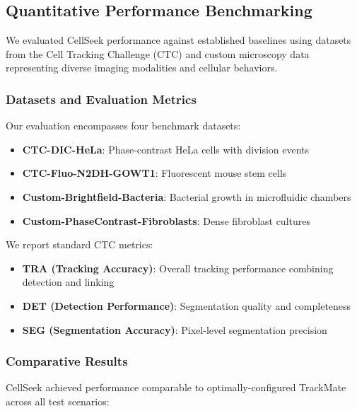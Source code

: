 \documentclass[12pt]{article}
\begin{document}
\subsection{Quantitative Performance Benchmarking}


We evaluated CellSeek performance against established baselines using datasets from the Cell Tracking Challenge (CTC) and custom microscopy data representing diverse imaging modalities and cellular behaviors.

\subsubsection{Datasets and Evaluation Metrics}

Our evaluation encompasses four benchmark datasets:
\begin{itemize}
  \item \textbf{CTC-DIC-HeLa}: Phase-contrast HeLa cells with division events
  \item \textbf{CTC-Fluo-N2DH-GOWT1}: Fluorescent mouse stem cells
  \item \textbf{Custom-Brightfield-Bacteria}: Bacterial growth in microfluidic chambers
  \item \textbf{Custom-PhaseContrast-Fibroblasts}: Dense fibroblast cultures
\end{itemize}

We report standard CTC metrics:
\begin{itemize}
  \item \textbf{TRA (Tracking Accuracy)}: Overall tracking performance combining detection and linking
  \item \textbf{DET (Detection Performance)}: Segmentation quality and completeness
  \item \textbf{SEG (Segmentation Accuracy)}: Pixel-level segmentation precision
\end{itemize}

\subsubsection{Comparative Results}

CellSeek achieved performance comparable to optimally-configured TrackMate across all test scenarios:
\end{document}
